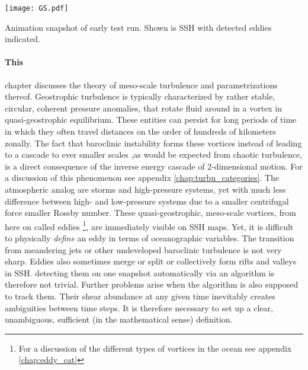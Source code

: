 \label{chap:intro}



\begin{marginfigure}
  \texttt{[image: GS.pdf]}
\caption{Animation snapshot of early test run. Shown is SSH with detected eddies indicated.}
\end{marginfigure}


\paragraph{This}chapter discusses the theory of meso-scale turbulence and parametrizations thereof.
Geostrophic turbulence is typically characterized by rather stable, circular, coherent pressure anomalies, that rotate fluid around in a vortex in
quasi-geostrophic equilibrium. These entities can persist for long periods of time in which they often travel distances on the order of hundreds of kilometers
zonally. The fact that baroclinic instability forms these vortices instead of leading to a cascade to ever smaller scales ,as would be expected from chaotic
turbulence, is a direct consequence of the inverse energy cascade of 2-dimensional motion. For a discussion of this phenomenon see appendix
\ref{chap:turbu_categories}. The atmospheric analog are storms and high-pressure systems, yet with much less difference between high- and low-pressure systems due to
a smaller centrifugal force \ie smaller Rossby number. These quasi-geostrophic, meso-scale vortices, from here on called eddies \footnote{For a discussion of
the different types of vortices in the ocean see appendix \ref{chap:eddy_cat}}, are immediately visible on
SSH maps. Yet, it is difficult to physically \emph{define} an eddy in terms of oceanographic variables. The transition from meandering jets or other undeveloped
baroclinic turbulence is not very sharp. Eddies also sometimes merge or split or collectively form rifts and valleys in SSH. detecting them on one snapshot
automatically via an algorithm is therefore not trivial. Further problems arise when the algorithm is also supposed to track them. Their shear abundance at any
given time inevitably creates ambiguities between time steps. It is therefore necessary to set up a clear, unambiguous, sufficient (in the mathematical sense)
definition.\\

